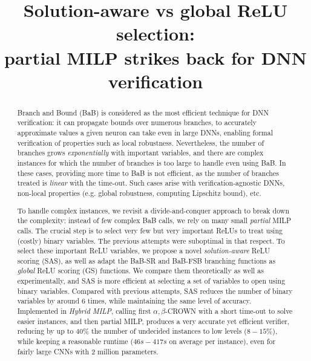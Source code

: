 \documentclass{llncs}
\title{Solution-aware vs global ReLU selection: \\
partial MILP strikes back for DNN verification}
\date{}
\begin{document}
	
	\maketitle
	\linenumbers
	\begin{abstract}
		Branch and Bound (BaB) is considered as the most efficient technique for DNN verification: it can propagate bounds over numerous branches, 
		to accurately approximate values a given neuron can take even in large DNNs, enabling formal verification of properties such as local robustness. Nevertheless, the number of branches grows {\em exponentially} with important variables, and there are complex instances for which the number of branches is too large to handle even using BaB. In these cases, providing more time to BaB is not efficient, as the number of branches treated is {\em linear} with the time-out. Such cases arise with verification-agnostic DNNs, non-local properties (e.g. global robustness, computing Lipschitz bound), etc. 
				
        To handle complex instances, we revisit a divide-and-conquer approach to break down the complexity: instead of few complex BaB calls, we rely on many small {\em partial} MILP calls. The crucial step is to select very few but very important ReLUs to treat using (costly) binary variables. The previous attempts were suboptimal in that respect. To select these important ReLU variables, we propose a novel {\em solution-aware} ReLU scoring ({\sf SAS}), as well as adapt the BaB-SR and BaB-FSB branching functions as {\em global} ReLU scoring ({\sf GS}) functions. 
		We compare them theoretically as well as experimentally, and {\sf SAS} is more efficient at selecting a set of variables to open using binary variables.
		Compared with previous attempts, SAS reduces the number of binary variables by around 6 times, while maintaining the same level of accuracy. Implemented in {\em Hybrid MILP}, calling first $\alpha,\beta$-CROWN with a short time-out to solve easier instances, and then partial MILP, produces a very accurate yet efficient verifier, reducing by up to $40\%$ the number of undecided instances to low levels ($8-15\%$), while keeping a reasonable runtime ($46s-417s$ on average per instance), 
		even for fairly large CNNs with 2 million parameters.


\end{abstract}
\end{document}
